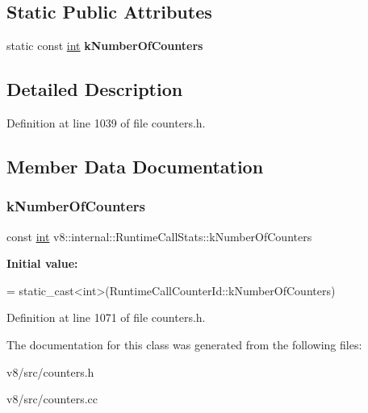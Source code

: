 \subsection*{Static Public Attributes}
\begin{DoxyCompactItemize}
\item 
static const \mbox{\hyperlink{classint}{int}} {\bfseries k\+Number\+Of\+Counters}
\end{DoxyCompactItemize}


\subsection{Detailed Description}


Definition at line 1039 of file counters.\+h.



\subsection{Member Data Documentation}
\mbox{\label{classv8_1_1internal_1_1RuntimeCallStats_aeb94f5521b0af0d7a1ab59ce95a4518f}} 
\subsubsection{\texorpdfstring{k\+Number\+Of\+Counters}{kNumberOfCounters}}
{\footnotesize\ttfamily const \mbox{\hyperlink{classint}{int}} v8\+::internal\+::\+Runtime\+Call\+Stats\+::k\+Number\+Of\+Counters\hspace{0.3cm}{\ttfamily [static]}}

{\bfseries Initial value\+:}
\begin{DoxyCode}
=
      \textcolor{keyword}{static\_cast<}\textcolor{keywordtype}{int}\textcolor{keyword}{>}(RuntimeCallCounterId::kNumberOfCounters)
\end{DoxyCode}


Definition at line 1071 of file counters.\+h.



The documentation for this class was generated from the following files\+:\begin{DoxyCompactItemize}
\item 
v8/src/counters.\+h\item 
v8/src/counters.\+cc\end{DoxyCompactItemize}
